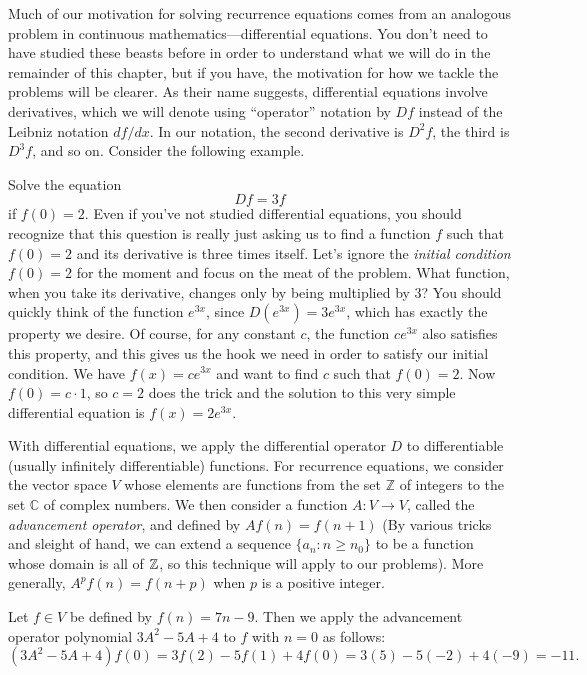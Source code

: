 Much of our motivation for solving recurrence equations comes from an
analogous problem in continuous mathematics---differential
equations. You don't need to have studied these beasts before in order
to understand what we will do in the remainder of this chapter, but if
you have, the motivation for how we tackle the problems will be
clearer. As their name suggests, differential equations involve
derivatives, which we will denote using ``operator'' notation by $Df$
instead of the Leibniz notation $df/dx$. In our notation, the second
derivative is $D^2 f$, the third is $D^3 f$, and so on. Consider the
following example.

\begin{example}\label{ex:recurrence:diffeq}
  Solve the equation
  \[Df = 3f\] if $f(0) = 2$. Even if you've not studied differential
  equations, you should recognize that this question is really just
  asking us to find a function $f$ such that $f(0)=2$ and its
  derivative is three times itself. Let's ignore the \emph{initial
    condition} $f(0)=2$ for the moment and focus on the meat of the
  problem. What function, when you take its derivative, changes only
  by being multiplied by $3$?  You should quickly think of the
  function $e^{3x}$, since $D(e^{3x}) = 3e^{3x}$, which has exactly
  the property we desire. Of course, for any constant $c$, the
  function $ce^{3x}$ also satisfies this property, and this gives us
  the hook we need in order to satisfy our initial condition. We have
  $f(x) = ce^{3x}$ and want to find $c$ such that $f(0)=2$. Now $f(0)
  = c\cdot 1$, so $c=2$ does the trick and the solution to this very
  simple differential equation is $f(x) = 2e^{3x}$.
\end{example}

With differential equations, we apply the differential operator $D$ to
differentiable (usually infinitely differentiable) functions. For
recurrence equations, we consider the vector space $V$ whose elements
are functions from the set $\mathbb{Z}$ of integers to the set
$\mathbb{C}$ of complex numbers.  We then consider a function
$A:V\longrightarrow V$, called the 
\textit{advancement operator}, and defined by $A f(n) = f(n+1)$
(By various tricks and sleight of hand, we can extend a sequence 
$\{a_n\colon n\geq n_0\}$ to be a function whose domain is all of $\mathbb{Z}$, 
so this technique will apply to our problems). 
More generally, $A^p f(n)= f(n+p)$ when $p$ is
a positive integer.

\begin{example}
Let $f\in V$ be defined by $f(n)=7n-9$.  Then we apply the advancement
operator polynomial $3A^2-5A+4$ to $f$ with $n=0$ as follows:
\[
(3A^2-5A+4)f(0)=3f(2) - 5f(1) +4f(0)= 3(5)-5(-2)+4(-9)=-11.
\]
\end{example}

